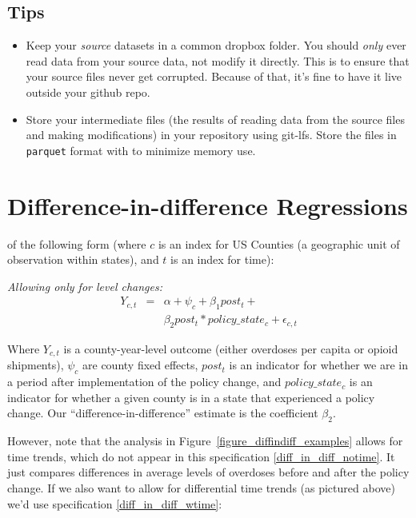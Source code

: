 \documentclass[12pt]{article}
\begin{document}
\subsection*{Tips}
\begin{itemize}
  \item Keep your \emph{source} datasets in a common dropbox folder. You should \emph{only} ever read data from your source data, not modify it directly. This is to ensure that your source files never get corrupted. Because of that, it's fine to have it live outside your github repo.
  \item Store your intermediate files (the results of reading data from the source files and making modifications) in your repository using git-lfs. Store the files in \texttt{parquet} format with to minimize memory use.
\end{itemize}

\appendix

\section{Difference-in-difference Regressions}\label{appendix_diffindiff}

of the following form (where $c$ is an index for US Counties (a geographic unit of observation within states), and $t$ is an index for time):

\emph{Allowing only for level changes:}
\begin{eqnarray}
 Y_{c,t} &=& \alpha + \psi_{c} + \beta_1 post_{t} + \label{diff_in_diff_notime}\\
  && \beta_2 post_{t} * policy\_state_{c} + \epsilon_{c,t} \nonumber
\end{eqnarray}

Where $Y_{c,t}$ is a county-year-level outcome (either overdoses per capita or opioid shipments),  $\psi_c$ are county fixed effects, $post_{t}$ is an indicator for whether we are in a period after implementation of the policy change, and $policy\_state_{c}$ is an indicator for whether a given county is in a state that experienced a policy change. Our ``difference-in-difference'' estimate is the coefficient $\beta_2$.

However, note that the analysis in Figure~\ref{figure_diffindiff_examples} allows for time trends, which do not appear in this specification \ref{diff_in_diff_notime}. It just compares differences in average levels of overdoses before and after the policy change. If we also want to allow for differential time trends (as pictured above) we'd use specification \ref{diff_in_diff_wtime}:
\end{document}

